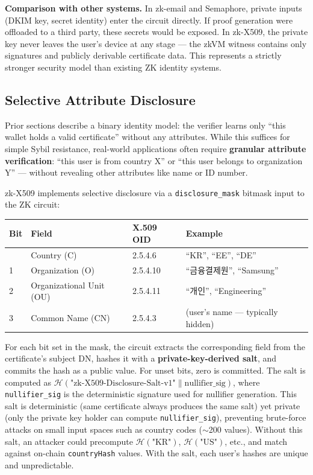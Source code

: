 \documentclass[11pt, a4paper]{article}
\begin{document}
\textbf{Comparison with other systems.} In zk-email and Semaphore,
private inputs (DKIM key, secret identity) enter the circuit directly.
If proof generation were offloaded to a third party, these secrets would
be exposed. In zk-X509, the private key never leaves the user's device
at any stage --- the zkVM witness contains only signatures and publicly
derivable certificate data. This represents a strictly stronger security
model than existing ZK identity systems.

\subsection{Selective Attribute
Disclosure}\label{selective-attribute-disclosure}

Prior sections describe a binary identity model: the verifier learns
only ``this wallet holds a valid certificate'' without any attributes.
While this suffices for simple Sybil resistance, real-world applications
often require \textbf{granular attribute verification}: ``this user is
from country X'' or ``this user belongs to organization Y'' --- without
revealing other attributes like name or ID number.

zk-X509 implements selective disclosure via a \texttt{disclosure\_mask}
bitmask input to the ZK circuit:

\begin{longtable}[]{@{}llll@{}}
\toprule\noalign{}
Bit & Field & X.509 OID & Example \\
\midrule\noalign{}
\endhead
\bottomrule\noalign{}
\endlastfoot
0 & Country (C) & 2.5.4.6 & ``KR'', ``EE'', ``DE'' \\
1 & Organization (O) & 2.5.4.10 & ``금융결제원'', ``Samsung'' \\
2 & Organizational Unit (OU) & 2.5.4.11 & ``개인'', ``Engineering'' \\
3 & Common Name (CN) & 2.5.4.3 & (user's name --- typically hidden) \\
\end{longtable}

For each bit set in the mask, the circuit extracts the corresponding
field from the certificate's subject DN, hashes it with a
\textbf{private-key-derived salt}, and commits the hash as a public
value. For unset bits, zero is committed. The salt is computed as
\(\mathcal{H}(\text{"zk-X509-Disclosure-Salt-v1"} \| \text{nullifier\_sig})\),
where \texttt{nullifier\_sig} is the deterministic signature used for
nullifier generation. This salt is deterministic (same certificate
always produces the same salt) yet private (only the private key holder
can compute \texttt{nullifier\_sig}), preventing brute-force attacks on
small input spaces such as country codes ($\sim$200 values).
Without this salt, an attacker could precompute
\(\mathcal{H}(\text{"KR"})\), \(\mathcal{H}(\text{"US"})\), etc., and
match against on-chain \texttt{countryHash} values. With the salt, each
user's hashes are unique and unpredictable.
\end{document}
